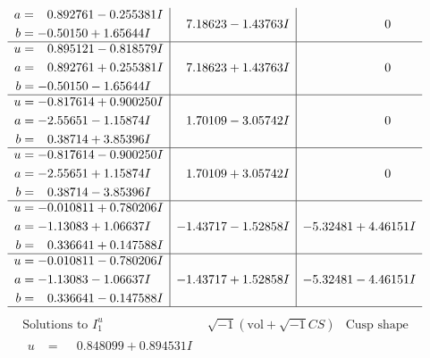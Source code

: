 \documentclass[1p]{elsarticle_modified}
\theoremstyle{definition}
\newcommand{\I}{\sqrt{-1}}
\begin{document}
$$\begin{array}{c|c|c}
\begin{aligned}
a &= \phantom{-}0.892761 - 0.255381 I \\
b &= -0.50150 + 1.65644 I\end{aligned}
 & \phantom{-}7.18623 - 1.43763 I & \phantom{-0.000000 } 0 \\ \hline\begin{aligned}
u &= \phantom{-}0.895121 - 0.818579 I \\
a &= \phantom{-}0.892761 + 0.255381 I \\
b &= -0.50150 - 1.65644 I\end{aligned}
 & \phantom{-}7.18623 + 1.43763 I & \phantom{-0.000000 } 0 \\ \hline\begin{aligned}
u &= -0.817614 + 0.900250 I \\
a &= -2.55651 - 1.15874 I \\
b &= \phantom{-}0.38714 + 3.85396 I\end{aligned}
 & \phantom{-}1.70109 - 3.05742 I & \phantom{-0.000000 } 0 \\ \hline\begin{aligned}
u &= -0.817614 - 0.900250 I \\
a &= -2.55651 + 1.15874 I \\
b &= \phantom{-}0.38714 - 3.85396 I\end{aligned}
 & \phantom{-}1.70109 + 3.05742 I & \phantom{-0.000000 } 0 \\ \hline\begin{aligned}
u &= -0.010811 + 0.780206 I \\
a &= -1.13083 + 1.06637 I \\
b &= \phantom{-}0.336641 + 0.147588 I\end{aligned}
 & -1.43717 - 1.52858 I & -5.32481 + 4.46151 I \\ \hline\begin{aligned}
u &= -0.010811 - 0.780206 I \\
a &= -1.13083 - 1.06637 I \\
b &= \phantom{-}0.336641 - 0.147588 I\end{aligned}
 & -1.43717 + 1.52858 I & -5.32481 - 4.46151 I\\
 \hline 
 \end{array}$$\newpage$$\begin{array}{c|c|c}  
\text{Solutions to }I^u_{1}& \I (\text{vol} + \sqrt{-1}CS) & \text{Cusp shape}\\
 \hline 
\begin{aligned}
u &= \phantom{-}0.848099 + 0.894531 I \\

\end{aligned}
\end{array}$$
\end{document}
